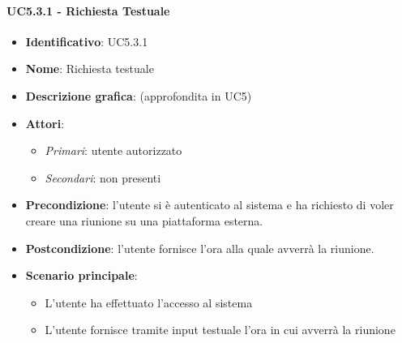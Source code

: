 \paragraph{UC5.3.1 - Richiesta Testuale}
\begin{itemize}
   \item \textbf{Identificativo}: UC5.3.1
   \item \textbf{Nome}: Richiesta testuale
   \item \textbf{Descrizione grafica}: (approfondita in UC5)
   \item \textbf{Attori}:
   \begin{itemize} 
       \item \textit{Primari}: utente autorizzato
       \item \textit{Secondari}: non presenti
   \end{itemize}
       \item \textbf{Precondizione}: l'utente si è autenticato al sistema e ha richiesto di voler creare una riunione su una piattaforma esterna.
       \item \textbf{Postcondizione}: l'utente fornisce l'ora alla quale avverrà la riunione.
    \item \textbf{Scenario principale}: 
       \begin{itemize}
           \item L'utente ha effettuato l'accesso al sistema 
           \item L'utente fornisce tramite input testuale l'ora in cui avverrà la riunione
       \end{itemize}
\end{itemize}

